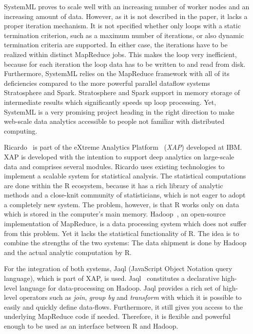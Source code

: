 SystemML proves to scale well with an increasing number of worker nodes and an increasing amount of data.
However, as it is not described in the paper, it lacks a proper iteration mechanism.
It is not specified whether only loops with a static termination criterion, such as a maximum number of iterations, or also dynamic termination criteria are supported.
In either case, the iterations have to be realized within distinct MapReduce jobs.
This makes the loop very inefficient, because for each iteration the loop data has to be written to and read from disk.
Furthermore, SystemML relies on the MapReduce framework with all of its deficiencies compared to the more powerful parallel dataflow systems Stratosphere and Spark.
Stratosphere and Spark support in memory storage of intermediate results which significantly speeds up loop processing.
Yet, SystemML is a very promising project heading in the right direction to make web-scale data analytics accessible to people not familiar with distributed computing.

Ricardo~\cite{das:2010a} is part of the eXtreme Analytics Platform~\cite{balmin:jrd2013a} (\emph{XAP}) developed at IBM.
XAP is developed with the intention to support deep analytics on large-scale data and comprises several modules.
Ricardo uses existing technologies to implement a scalable system for statistical analysis.
The statistical computations are done within the R ecosystem, because it has a rich library of analytic methods and a close-knit community of statisticians, which is not eager to adopt a completely new system.
The problem, however, is that R works only on data which is stored in the computer's main memory.
Hadoop~\cite{hadoop:2008a}, an open-source implementation of MapReduce, is a data processing system which does not suffer from this problem.
Yet it lacks the statistical functionality of R.
The idea is to combine the strengths of the two systems: The data shipment is done by Hadoop and the actual analytic computation by R.

For the integration of both systems, Jaql (JavaScript Object Notation query language), which is part of XAP, is used.
Jaql~\cite{beyer:2011a} constitutes a declarative high-level language for data-processing on Hadoop.
Jaql provides a rich set of high-level operators such as \emph{join}, \emph{group by} and \emph{transform} with which it is possible to easily and quickly define data-flows.
Furthermore, it still gives you access to the underlying MapReduce code if needed.
Therefore, it is flexible and powerful enough to be used as an interface between R and Hadoop.

